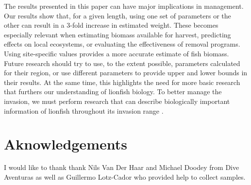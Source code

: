 \documentclass[fleqn,10pt,lineno]{wlpeerj} %
\theoremstyle{definition}
\theoremstyle{definition}
\theoremstyle{definition}
\theoremstyle{remark}
\begin{document}
The results presented in this paper can have major implications in
management. Our results show that, for a given length, using one set of
parameters or the other can result in a 3-fold increase in estimated
weight. These becomes especially relevant when estimating biomass
available for harvest, predicting effects on local ecosystems, or
evaluating the effectiveness of removal programs. Using site-specific
values provides a more accurate estimate of fish biomass. Future
research should try to use, to the extent possible, parameters
calculated for their region, or use different parameters to provide
upper and lower bounds in their results. At the same time, this
highlights the need for more basic research that furthers our
understanding of lionfish biology. To better manage the invasion, we
must perform research that can describe biologically important
information of lionfish throughout its invasion range
\citep{johnson_2016}.

\section*{Aknowledgements}

I would like to thank thank Nils Van Der Haar and Michael Doodey from
Dive Aventuras as well as Guillermo Lotz-Cador who provided help to
collect samples.


\end{document}
